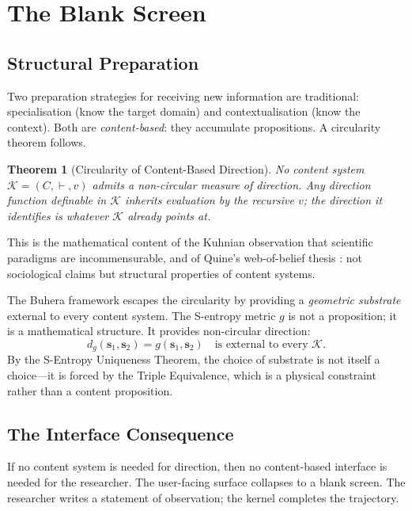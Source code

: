 \documentclass[twocolumn,11pt,a4paper]{article}
\newtheorem{theorem}{Theorem}[section]
\begin{document}
\section{The Blank Screen}
\label{sec:blank_screen}

\subsection{Structural Preparation}

Two preparation strategies for receiving new information are traditional: specialisation (know the target domain) and contextualisation (know the context). Both are \emph{content-based}: they accumulate propositions. A circularity theorem follows.

\begin{theorem}[Circularity of Content-Based Direction]
No content system $\mathcal{K} = (C, \vdash, v)$ admits a non-circular measure of direction. Any direction function definable in $\mathcal{K}$ inherits evaluation by the recursive $v$; the direction it identifies is whatever $\mathcal{K}$ already points at.
\end{theorem}

This is the mathematical content of the Kuhnian observation \cite{kuhn1962structure} that scientific paradigms are incommensurable, and of Quine's web-of-belief thesis \cite{quine1951two}: not sociological claims but structural properties of content systems.

The Buhera framework escapes the circularity by providing a \emph{geometric substrate} external to every content system. The S-entropy metric $g$ is not a proposition; it is a mathematical structure. It provides non-circular direction:
\begin{equation}
d_g(\mathbf{s}_1, \mathbf{s}_2) = g(\mathbf{s}_1, \mathbf{s}_2) \quad \text{is external to every } \mathcal{K}.
\end{equation}
By the S-Entropy Uniqueness Theorem, the choice of substrate is not itself a choice---it is forced by the Triple Equivalence, which is a physical constraint rather than a content proposition.

\subsection{The Interface Consequence}

If no content system is needed for direction, then no content-based interface is needed for the researcher. The user-facing surface collapses to a blank screen. The researcher writes a statement of observation; the kernel completes the trajectory.
\end{document}
